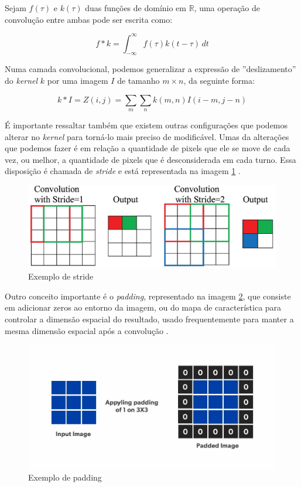 Sejam $f(\tau)$ e $k(\tau)$ duas funções de domínio em $\mathbb{R}$, uma operação de convolução entre ambas pode ser escrita como:

$$
f \ast k = \int_{- \infty}^{\infty} f(\tau)k(t - \tau) \,dt 
$$

Numa camada convolucional, podemos generalizar a expressão de ''deslizamento'' do \textit{kernel} $k$ por uma imagem $I$ de tamanho $m \times n$, da seguinte forma:

$$
k \ast I = Z(i,j) = \sum_{m} \sum_{n}{k(m,n) I(i - m, j - n)}
$$

É importante ressaltar também que existem outras configurações que podemos alterar no \textit{kernel} para torná-lo mais preciso de modificável. Umas da alterações que podemos fazer é em relação a quantidade de pixels que ele se move de cada vez, ou melhor, a quantidade de pixels que é desconsiderada em cada turno. Essa disposição é chamada de \textit{stride} e está representada na imagem \ref{pic:stride} \cite{GoodfellowBengioCourville2016}. 


\begin{figure}[!ht]
    \begin{center}
    \includegraphics[width=350pt]{pictures/stride.jpg}
    \caption{Exemplo de stride}
    \label{pic:stride}
    \end{center}
\end{figure}


Outro conceito importante é o \textit{padding}, representado na imagem \ref{pic:padding}, que consiste em adicionar zeros ao entorno da imagem, ou do mapa de característica para controlar a dimensão espacial do resultado, usado frequentemente para manter a mesma dimensão espacial após a convolução \cite{GoodfellowBengioCourville2016}.


\begin{figure}[!ht]
    \begin{center}
    \includegraphics[width=350pt]{pictures/padding.jpg}
    \caption{Exemplo de padding}
    \label{pic:padding}
    \end{center}
\end{figure}


